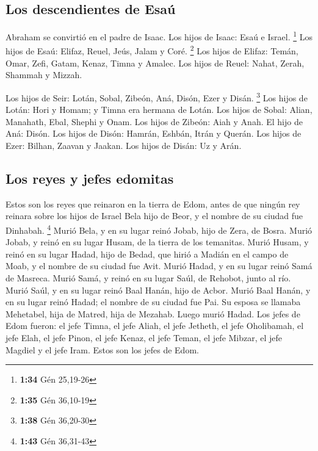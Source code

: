\begin{paracol}{2}
\hypertarget{los-descendientes-de-esauxfa}{%
\subsection{Los descendientes de
Esaú}\label{los-descendientes-de-esauxfa}}

 Abraham se convirtió en el padre de Isaac. Los hijos de
Isaac: Esaú e Israel. \footnote{\textbf{1:34} Gén 25,19-26}
 Los hijos de Esaú: Elifaz, Reuel, Jeús, Jalam y Coré.
\footnote{\textbf{1:35} Gén 36,10-19}  Los hijos de
Elifaz: Temán, Omar, Zefi, Gatam, Kenaz, Timna y Amalec. 
Los hijos de Reuel: Nahat, Zerah, Shammah y Mizzah.

 Los hijos de Seir: Lotán, Sobal, Zibeón, Aná, Disón,
Ezer y Disán. \footnote{\textbf{1:38} Gén 36,20-30}  Los
hijos de Lotán: Hori y Homam; y Timna era hermana de Lotán.
 Los hijos de Sobal: Alian, Manahath, Ebal, Shephi y
Onam. Los hijos de Zibeón: Aiah y Anah.  El hijo de Aná:
Disón. Los hijos de Disón: Hamrán, Eshbán, Itrán y Querán.
 Los hijos de Ezer: Bilhan, Zaavan y Jaakan. Los hijos de
Disán: Uz y Arán.

\hypertarget{los-reyes-y-jefes-edomitas}{%
\subsection{Los reyes y jefes
edomitas}\label{los-reyes-y-jefes-edomitas}}

 Estos son los reyes que reinaron en la tierra de Edom,
antes de que ningún rey reinara sobre los hijos de Israel Bela hijo de
Beor, y el nombre de su ciudad fue Dinhabah. \footnote{\textbf{1:43} Gén
  36,31-43}  Murió Bela, y en su lugar reinó Jobab, hijo
de Zera, de Bosra.  Murió Jobab, y reinó en su lugar
Husam, de la tierra de los temanitas.  Murió Husam, y
reinó en su lugar Hadad, hijo de Bedad, que hirió a Madián en el campo
de Moab, y el nombre de su ciudad fue Avit.  Murió Hadad,
y en su lugar reinó Samá de Masreca.  Murió Samá, y reinó
en su lugar Saúl, de Rehobot, junto al río.  Murió Saúl,
y en su lugar reinó Baal Hanán, hijo de Acbor.  Murió
Baal Hanán, y en su lugar reinó Hadad; el nombre de su ciudad fue Pai.
Su esposa se llamaba Mehetabel, hija de Matred, hija de Mezahab.
 Luego murió Hadad. Los jefes de Edom fueron: el jefe
Timna, el jefe Aliah, el jefe Jetheth,  el jefe
Oholibamah, el jefe Elah, el jefe Pinon,  el jefe Kenaz,
el jefe Teman, el jefe Mibzar,  el jefe Magdiel y el jefe
Iram. Estos son los jefes de Edom.


\end{paracol}
